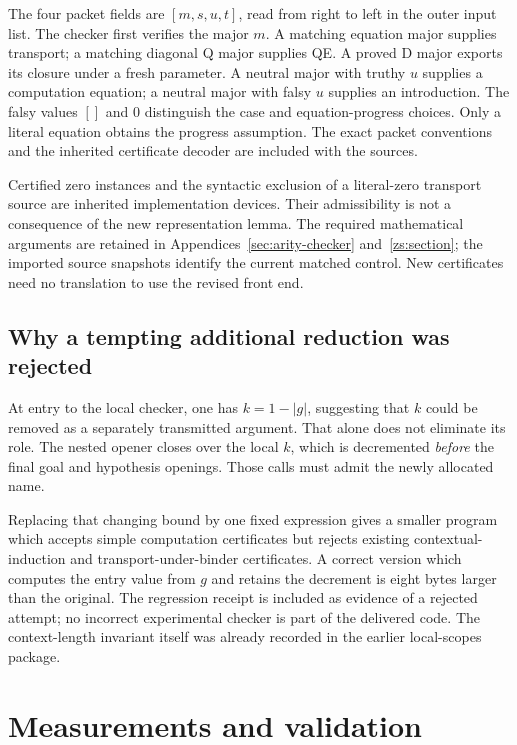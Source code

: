 \documentclass[11pt,letterpaper]{article}
\theoremstyle{definition}
\theoremstyle{remark}
\begin{document}
The four packet fields are $[m,s,u,t]$, read from right to left in the outer
input list. The checker first verifies the major $m$. A matching equation
major supplies transport; a matching diagonal Q major supplies QE. A
proved D major exports its closure under a fresh parameter. A neutral major
with truthy $u$ supplies a computation equation; a neutral major with falsy
$u$ supplies an introduction. The falsy values $[]$ and $0$ distinguish the
case and equation-progress choices. Only a literal equation obtains the
progress assumption. The exact packet conventions and the inherited
certificate decoder are included with the sources.

Certified zero instances and the syntactic exclusion of a literal-zero
transport source are inherited implementation devices. Their admissibility
is not a consequence of the new representation lemma. The required
mathematical arguments are retained in
Appendices~\ref{sec:arity-checker} and~\ref{zs:section}; the imported
source snapshots identify the current matched control. New certificates
need no translation to use the revised front end.

\subsection{Why a tempting additional reduction was rejected}
At entry to the local checker, one has $k=1-\lvert g\rvert$, suggesting
that $k$ could be removed as a separately transmitted argument. That alone
does not eliminate its role. The nested opener closes over the local $k$,
which is decremented \emph{before} the final goal and hypothesis openings.
Those calls must admit the newly allocated name.

Replacing that changing bound by one fixed expression gives a smaller
program which accepts simple computation certificates but rejects existing
contextual-induction and transport-under-binder certificates. A correct
version which computes the entry value from $g$ and retains the decrement
is eight bytes larger than the original. The regression receipt is included
as evidence of a rejected attempt; no incorrect experimental checker is
part of the delivered code. The context-length invariant itself was already
recorded in the earlier local-scopes package.

\clearpage
\section{Measurements and validation}
\label{sec:measurements}
\end{document}
